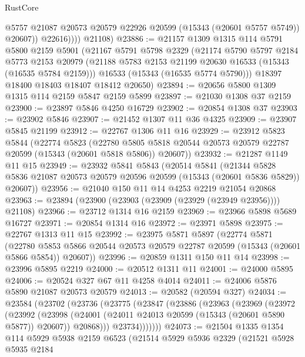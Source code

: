 \begin{lexlean}{RustCore}
\begin{coremodule}
                  @5757
                  @21087
                  @20573
                  @20579
                  @22926
                  @20599
                  (@15343 (@20601 @5757 @5749))
                  @20607))
              @22616))))
      @21108)
@23886 := @21157
    @1309
    @1315
    @114
    @5791
    @5800
    @2159
    @5901
    (@21167
      @5791
      @5798
      @2329
      (@21174
        @5790
        @5797
        @2184
        @5773
        @2153
        @20979
        (@21188 @5783 @2153 @21199 @20630 @16533 (@15343 (@16535 @5784 @2159)))
        @16533
        (@15343 (@16535 @5774 @5790)))
      @18397
      @18400
      @18403
      @18407
      @18412
      @20650)
@23894 := @20656 @5800 @1309 @1315 @114 @2159 @5847 @2159 @5899
@23897 := @21030 @1308 @37 @2159
@23900 := @23897 @5846 @4250 @16729
@23902 := @20854 @1308 @37
@23903 := @23902 @5846
@23907 := @21452 @1307 @11 @36 @4325
@23909 := @23907 @5845 @21199
@23912 := @22767 @1306 @11 @16
@23929 := @23912
    @5823
    @5844
    (@22774
      @5823
      (@22780 @5805 @5818 @20544 @20573 @20579 @22787 @20599 (@15343 (@20601 @5818 @5806)) @20607))
@23932 := @21287 @1149 @11 @15
@23949 := @23932
    @5841
    @5843
    (@20514
      @5841
      (@21344 @5828 @5836 @21087 @20573 @20579 @20596 @20599 (@15343 (@20601 @5836 @5829)) @20607))
@23956 := @21040 @150 @11 @14 @4253 @2219 @21054 @20868
@23963 := @23894 (@23900 (@23903 (@23909 (@23929 (@23949 @23956)))) @21108)
@23966 := @23712 @1314 @16 @2159
@23969 := @23966 @5898 @5689 @16727
@23971 := @20854 @1314 @16
@23972 := @23971 @5898
@23975 := @22767 @1313 @11 @15
@23992 := @23975
    @5871
    @5897
    (@22774
      @5871
      (@22780 @5853 @5866 @20544 @20573 @20579 @22787 @20599 (@15343 (@20601 @5866 @5854)) @20607))
@23996 := @20859 @1311 @150 @11 @14
@23998 := @23996 @5895 @2219
@24000 := @20512 @1311 @11
@24001 := @24000 @5895
@24006 := @20524 @327 @67 @11 @4258 @4014
@24011 := @24006 @5876 @5890 @21087 @20573 @20579
@24013 := @20582 (@20594 @327)
@24034 := @23584
    (@23702
      (@23736
        (@23775
          (@23847
            (@23886
              (@23963
                (@23969
                  (@23972
                    (@23992
                      (@23998
                        (@24001 (@24011 @24013 @20599 (@15343 (@20601 @5890 @5877)) @20607))
                        @20868)))
                  @23734)))))))
@24073 := @21504
    @1335
    @1354
    @114
    @5929
    @5938
    @2159
    @6523
    (@21514
      @5929
      @5936
      @2329
      (@21521
        @5928
        @5935
        @2184

\end{coremodule}
\end{lexlean}
